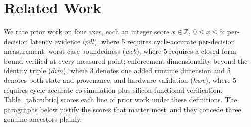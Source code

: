 \documentclass[conference]{IEEEtran}
\begin{document}
\section{Related Work}

We rate prior work on four axes, each an integer score $x \in \mathbb{Z},\ 0 \le x \le 5$: per-decision latency evidence ($\mathit{pdl}$), where 5 requires cycle-accurate per-decision measurement; worst-case boundedness ($\mathit{wcb}$), where 5 requires a closed-form bound verified at every measured point; enforcement dimensionality beyond the identity triple ($\mathit{dim}$), where 3 denotes one added runtime dimension and 5 denotes both state and provenance; and hardware validation ($\mathit{hwv}$), where 5 requires cycle-accurate co-simulation plus silicon functional verification. Table~\ref{tab:rubric} scores each line of prior work under these definitions. The paragraphs below justify the scores that matter most, and they concede three genuine ancestors plainly.
\end{document}
